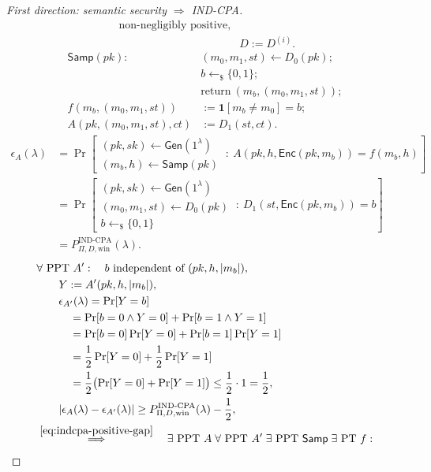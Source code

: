 \documentclass[12pt,a4paper]{article}
\begin{document}
\begin{proof}[First direction: semantic security $\Longrightarrow$ IND-CPA]
\[\begin{aligned}
\text{ non-negligibly positive},\\
&D:=D^{(i)}.
\end{aligned}
\tag{1}\label{eq:indcpa-positive-gap}
\]
\[
\begin{aligned}
\mathsf{Samp}(pk):\quad
&(m_0,m_1,st)\leftarrow D_0(pk);\\
&b\leftarrow_{\$}\{0,1\};\\
&\mathrm{return}\ (m_b,(m_0,m_1,st));\\[4pt]
f(m_b,(m_0,m_1,st))&:=\mathbf{1}[m_b\ne m_0]=b;\\[4pt]
A(pk,(m_0,m_1,st),ct)&:=D_1(st,ct).
\end{aligned}
\]
\[
\begin{aligned}
\epsilon_A(\lambda)
&=\Pr\!\left[
\begin{array}{l}
(pk,sk)\leftarrow\mathsf{Gen}(1^\lambda)\\
(m_b,h)\leftarrow\mathsf{Samp}(pk)
\end{array}
\ :\ A(pk,h,\mathsf{Enc}(pk,m_b))=f(m_b,h)\right]\\[6pt]
&=\Pr\!\left[
\begin{array}{l}
(pk,sk)\leftarrow\mathsf{Gen}(1^\lambda)\\
(m_0,m_1,st)\leftarrow D_0(pk)\\
b\leftarrow_{\$}\{0,1\}
\end{array}
\ :\ D_1(st,\mathsf{Enc}(pk,m_b))=b\right]\\[6pt]
&=P_{\Pi,D,\mathrm{win}}^{\mathrm{IND\text{-}CPA}}(\lambda).
\end{aligned}
\]
\[
\begin{aligned}
&\forall\text{ PPT }A':\quad
b\text{ independent of }(pk,h,|m_b|),\\
&\qquad Y:=A'(pk,h,|m_b|),\\
&\qquad\epsilon_{A'}(\lambda)=\Pr[Y=b]\\
&\qquad\quad=\Pr[b=0\land Y=0]+\Pr[b=1\land Y=1]\\
&\qquad\quad=\Pr[b=0]\Pr[Y=0]+\Pr[b=1]\Pr[Y=1]\\
&\qquad\quad=\frac12\Pr[Y=0]+\frac12\Pr[Y=1]\\
&\qquad\quad=\frac12\bigl(\Pr[Y=0]+\Pr[Y=1]\bigr)
\leq\frac12\cdot1=\frac12,\\
&\qquad|\epsilon_A(\lambda)-\epsilon_{A'}(\lambda)|
\geq P_{\Pi,D,\mathrm{win}}^{\mathrm{IND\text{-}CPA}}(\lambda)-\frac12,\\
&\overset{\eqref{eq:indcpa-positive-gap}}{\Longrightarrow}\quad
\exists\text{ PPT }A\;\forall\text{ PPT }A'\;
\exists\text{ PPT }\mathsf{Samp}\;\exists\text{ PT }f:\\

\end{aligned}\]
\end{proof}
\end{document}
